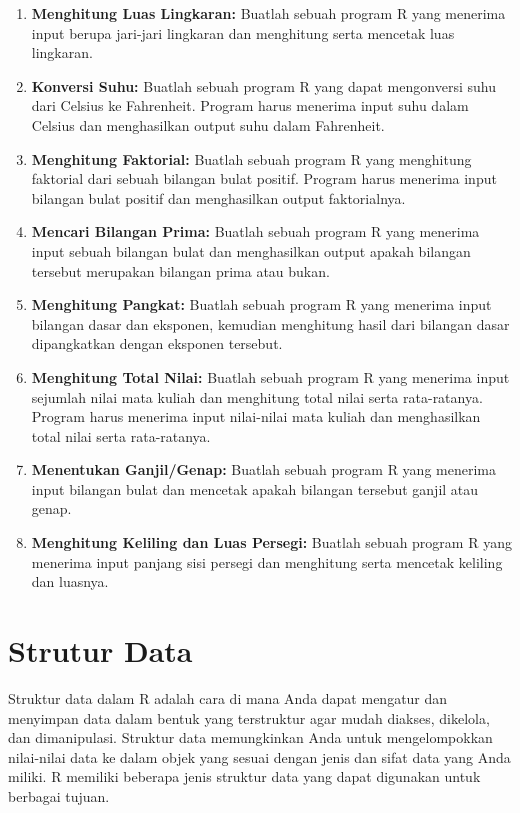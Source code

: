 \documentclass[
]{book}
\providecommand{\tightlist}{%
  \setlength{\itemsep}{0pt}\setlength{\parskip}{0pt}}
\begin{document}
\begin{enumerate}
\def\labelenumi{\arabic{enumi}.}
\tightlist
\item
  \textbf{Menghitung Luas Lingkaran:} Buatlah sebuah program R yang menerima input berupa jari-jari lingkaran dan menghitung serta mencetak luas lingkaran.
\item
  \textbf{Konversi Suhu:} Buatlah sebuah program R yang dapat mengonversi suhu dari Celsius ke Fahrenheit. Program harus menerima input suhu dalam Celsius dan menghasilkan output suhu dalam Fahrenheit.
\item
  \textbf{Menghitung Faktorial:} Buatlah sebuah program R yang menghitung faktorial dari sebuah bilangan bulat positif. Program harus menerima input bilangan bulat positif dan menghasilkan output faktorialnya.
\item
  \textbf{Mencari Bilangan Prima:} Buatlah sebuah program R yang menerima input sebuah bilangan bulat dan menghasilkan output apakah bilangan tersebut merupakan bilangan prima atau bukan.
\item
  \textbf{Menghitung Pangkat:} Buatlah sebuah program R yang menerima input bilangan dasar dan eksponen, kemudian menghitung hasil dari bilangan dasar dipangkatkan dengan eksponen tersebut.
\item
  \textbf{Menghitung Total Nilai:} Buatlah sebuah program R yang menerima input sejumlah nilai mata kuliah dan menghitung total nilai serta rata-ratanya. Program harus menerima input nilai-nilai mata kuliah dan menghasilkan total nilai serta rata-ratanya.
\item
  \textbf{Menentukan Ganjil/Genap:} Buatlah sebuah program R yang menerima input bilangan bulat dan mencetak apakah bilangan tersebut ganjil atau genap.
\item
  \textbf{Menghitung Keliling dan Luas Persegi:} Buatlah sebuah program R yang menerima input panjang sisi persegi dan menghitung serta mencetak keliling dan luasnya.
\end{enumerate}

\hypertarget{strutur-data}{%
\chapter{Strutur Data}\label{strutur-data}}

Struktur data dalam R adalah cara di mana Anda dapat mengatur dan menyimpan data dalam bentuk yang terstruktur agar mudah diakses, dikelola, dan dimanipulasi. Struktur data memungkinkan Anda untuk mengelompokkan nilai-nilai data ke dalam objek yang sesuai dengan jenis dan sifat data yang Anda miliki. R memiliki beberapa jenis struktur data yang dapat digunakan untuk berbagai tujuan.
\end{document}

